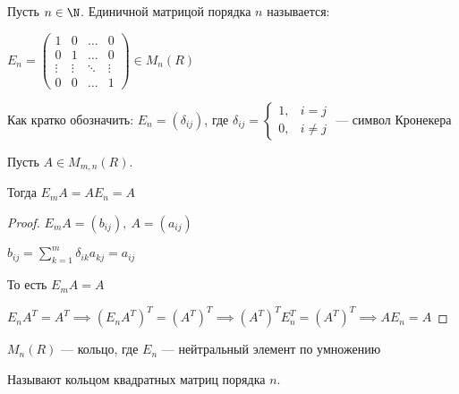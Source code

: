 \begin{defn}
    Пусть $n \in \N$. Единичной матрицой порядка $n$ называется:

    $E_n = \begin{pmatrix}
        1 & 0 & \ldots & 0 \\
        0 & 1 & \ldots & 0 \\
        \vdots & \vdots & \ddots & \vdots \\
        0 & 0 & \ldots & 1  
    \end{pmatrix} \in M_{n}(R)$

    Как кратко обозначить: $E_n = (\delta_{ij})$, где $\delta_{ij} = \begin{cases}
        1, & i = j \\
        0, & i \neq j
    \end{cases}$ --- символ Кронекера
\end{defn}

\begin{theorem-non}

    Пусть $A \in M_{m, n}(R)$.

    Тогда $E_m A = A E_n = A$
\end{theorem-non}

\begin{proof}

    $E_m A = (b_{ij}),~ A = (a_{ij})$

    $b_{ij} = \sum\limits_{k = 1}^m \delta_{ik} a_{kj} = a_{ij}$

    То есть $E_m A = A$

    $E_n A^T = A^T \implies (E_n A^T)^T = (A^T)^T \implies (A^T)^T E_n^T = (A^T)^T \implies A E_n = A$
\end{proof}

\begin{follow}
    $M_{n}(R)$ --- кольцо, где $E_n$ --- нейтральный элемент по умножению

    Называют кольцом квадратных матриц порядка $n$.
\end{follow}


